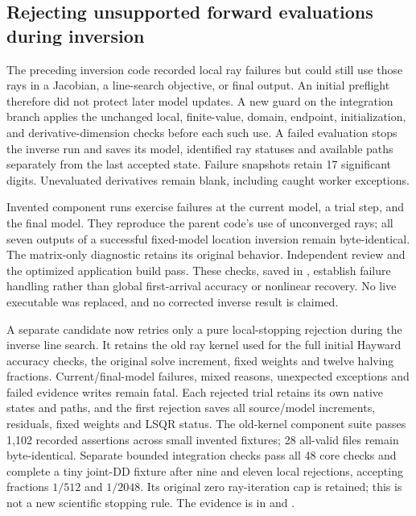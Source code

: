 \subsection{Rejecting unsupported forward evaluations during inversion}
The preceding inversion code recorded local ray failures but could still use
those rays in a Jacobian, a line-search objective, or final output. An initial
preflight therefore did not protect later model updates. A new guard on the
integration branch applies the unchanged local, finite-value, domain,
endpoint, initialization, and derivative-dimension checks before each such
use. A failed evaluation stops the inverse run and saves its model, identified
ray statuses and available paths separately from the last accepted state.
Failure snapshots retain 17 significant digits. Unevaluated derivatives remain
blank, including caught worker exceptions.

Invented component runs exercise failures at the current model, a trial step,
and the final model. They reproduce the parent code's use of unconverged rays;
all seven outputs of a successful fixed-model location inversion remain
byte-identical. The matrix-only diagnostic retains its original behavior.
Independent review and the optimized application build pass. These checks,
saved in , establish failure
handling rather than global first-arrival accuracy or nonlinear recovery.
No live executable was replaced, and no corrected inverse result is claimed.

A separate candidate now retries only a pure local-stopping rejection during
the inverse line search. It retains the old ray kernel used for the full
initial Hayward accuracy checks, the original solve increment, fixed weights
and twelve halving fractions. Current/final-model failures, mixed reasons,
unexpected exceptions and failed evidence writes remain fatal. Each rejected
trial retains its own native states and paths, and the first rejection saves
all source/model increments, residuals, fixed weights and LSQR status.
The old-kernel component suite passes 1,102 recorded assertions across small
invented fixtures; 28 all-valid files remain byte-identical. Separate bounded
integration checks pass all 48 core checks and complete a tiny joint-DD
fixture after nine and eleven local rejections, accepting fractions $1/512$
and $1/2048$. Its original zero ray-iteration cap is retained; this is not a
new scientific stopping rule. The evidence is in
and .

